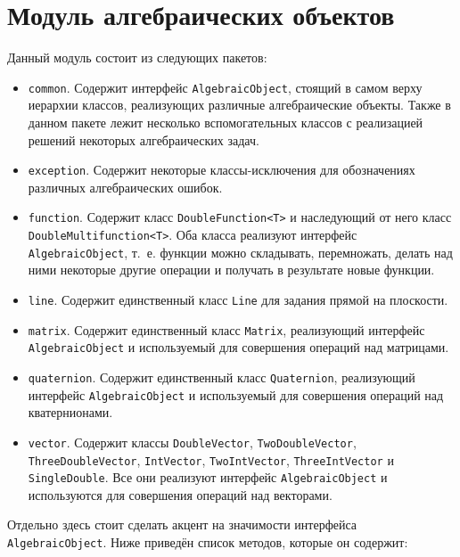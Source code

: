 \section{Модуль алгебраических объектов}

Данный модуль состоит из следующих пакетов:

\begin{itemize}

\item \texttt{common}. Содержит интерфейс \texttt{Algebraic\-Object}, стоящий в самом верху иерархии классов,
реализующих различные алгебраические объекты. Также в данном пакете лежит несколько вспомогательных классов
с реализацией решений некоторых алгебраических задач.
\item \texttt{exception}. Содержит некоторые классы-исключения для обозначениях различных алгебраических ошибок.
\item \texttt{function}. Содержит класс \texttt{Double\-Function<T>} и наследующий от него класс
\texttt{Double\-Multifunction<T>}. Оба класса реализуют интерфейс \texttt{Algebraic\-Object}, т.~е. функции можно
складывать, перемножать, делать над ними некоторые другие операции и получать в результате новые функции.
\item \texttt{line}. Содержит единственный класс \texttt{Line} для задания прямой на плоскости.
\item \texttt{matrix}. Содержит единственный класс \texttt{Matrix}, реализующий интерфейс \texttt{Al\-gebraic\-Object} и
используемый для совершения операций над матрицами.
\item \texttt{quaternion}. Содержит единственный класс \texttt{Quaternion}, реализующий интерфейс
\texttt{Algebraic\-Object} и используемый для совершения операций над кватернионами.
\item \texttt{vector}. Содержит классы \texttt{Double\-Vector}, \texttt{Two\-Double\-Vector},
\texttt{Three\-Double\-Vec\-tor}, \texttt{Int\-Vector}, \texttt{Two\-Int\-Vector}, \texttt{Three\-Int\-Vector} и
\texttt{Single\-Double}. Все они реализуют интерфейс \texttt{Algebraic\-Object} и используются для совершения операций
над векторами.

\end{itemize}

Отдельно здесь стоит сделать акцент на значимости интерфейса \texttt{Algebraic\-Object}. Ниже приведён список методов,
которые он содержит:

